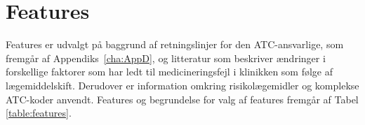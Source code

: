 %

\section{Features}
Features er udvalgt på baggrund af retningslinjer for den ATC-ansvarlige, som fremgår af Appendiks~\ref{cha:AppD}, og  litteratur som beskriver ændringer i forskellige faktorer som har ledt til medicineringsfejl i klinikken som følge af lægemiddelskift. Derudover er information omkring risikolægemidler og komplekse ATC-koder anvendt. 
Features og begrundelse for valg af features fremgår af Tabel \ref{table:features}.

